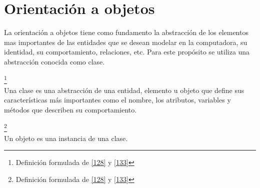 \section{Orientación a objetos}
La orientación a objetos tiene como fundamento la abstracción de los elementos mas importantes de las entidades que se desean modelar en la computadora, su identidad, su comportamiento, relaciones, etc. Para este propósito se utiliza una abstracción conocida como clase. 

\begin{definition}\footnote{Definición formulada de \hyperlink{128}{[128]} y \hyperlink{133}{[133]} }\\
    Una clase es una abstracción de una entidad, elemento u objeto que define sus características más importantes como el nombre, los atributos, variables y métodos que describen su comportamiento.
\end{definition}

\bigskip

\begin{definition}\footnote{Definición formulada de \hyperlink{128}{[128]} y \hyperlink{133}{[133]} }\\
    Un objeto es una instancia de una clase.
\end{definition}

\bigskip

